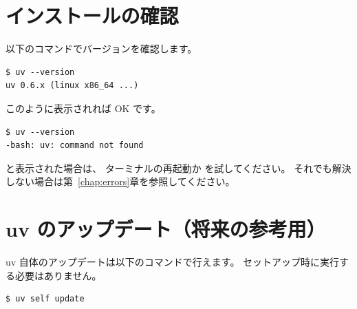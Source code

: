 \section{インストールの確認}

以下のコマンドでバージョンを確認します。

\begin{wslbox}[バージョン確認]
\begin{lstlisting}[style=bash]
$ uv --version
uv 0.6.x (linux x86_64 ...)
\end{lstlisting}
\end{wslbox}

このように表示されれば OK です。

\begin{wslbox}[失敗した場合の出力]
\begin{lstlisting}[style=bash]
$ uv --version
-bash: uv: command not found
\end{lstlisting}
\end{wslbox}

 と表示された場合は、
ターミナルの再起動か  を試してください。
それでも解決しない場合は第~\ref{chap:errors}章を参照してください。

\section{uv のアップデート（将来の参考用）}

uv 自体のアップデートは以下のコマンドで行えます。
セットアップ時に実行する必要はありません。

\begin{wslbox}[uv のアップデート]
\begin{lstlisting}[style=bash]
$ uv self update
\end{lstlisting}
\end{wslbox}

